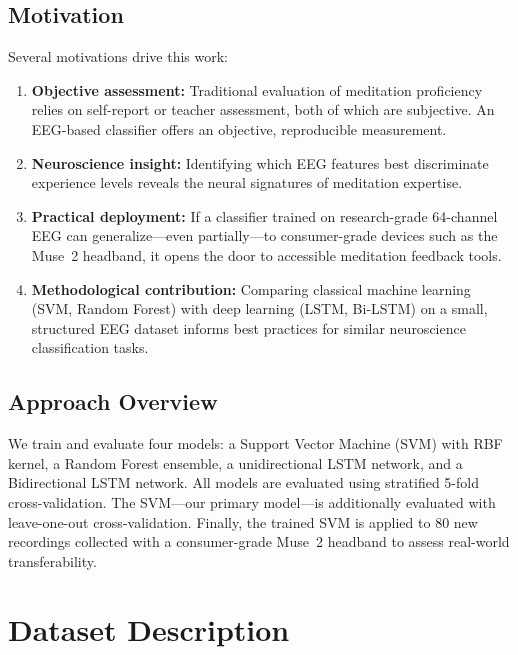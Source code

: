 \documentclass[12pt,a4paper]{article}
\begin{document}
\subsection{Motivation}

Several motivations drive this work:

\begin{enumerate}
  \item \textbf{Objective assessment:} Traditional evaluation of meditation proficiency relies on self-report or teacher assessment, both of which are subjective. An EEG-based classifier offers an objective, reproducible measurement.
  \item \textbf{Neuroscience insight:} Identifying which EEG features best discriminate experience levels reveals the neural signatures of meditation expertise.
  \item \textbf{Practical deployment:} If a classifier trained on research-grade 64-channel EEG can generalize---even partially---to consumer-grade devices such as the Muse~2 headband, it opens the door to accessible meditation feedback tools.
  \item \textbf{Methodological contribution:} Comparing classical machine learning (SVM, Random Forest) with deep learning (LSTM, Bi-LSTM) on a small, structured EEG dataset informs best practices for similar neuroscience classification tasks.
\end{enumerate}

\subsection{Approach Overview}

We train and evaluate four models: a Support Vector Machine (SVM) with RBF kernel, a Random Forest ensemble, a unidirectional LSTM network, and a Bidirectional LSTM network. All models are evaluated using stratified 5-fold cross-validation. The SVM---our primary model---is additionally evaluated with leave-one-out cross-validation. Finally, the trained SVM is applied to 80 new recordings collected with a consumer-grade Muse~2 headband to assess real-world transferability.

\section{Dataset Description}
\label{sec:dataset}
\end{document}
